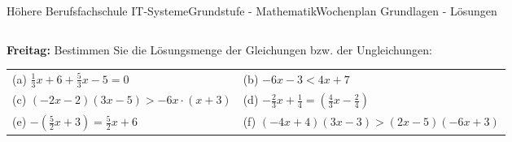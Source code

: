 \documentclass[oneside,openany,headings=optiontotoc,11pt,numbers=noenddot]{scrreprt}
\begin{document}
\begin{worksheet}{Höhere Berufsfachschule IT-Systeme}{Grundstufe - Mathematik}{Wochenplan Grundlagen - Lösungen}
\begin{framed}
\begin{tabularx}{\textwidth}{XXX}
			\end{tabularx}
		\end{framed}
		\begin{framed}
			\noindent
			\textbf{Freitag:} Bestimmen Sie die Lösungsmenge der Gleichungen bzw. der Ungleichungen:\\
			\begin{tabularx}{\textwidth}{XX}
				(a) \(\frac{1}{3}x + 6 + \frac{5}{3}x -5 = 0\) & (b) \(-6x-3 < 4x+7\)\\
				(c) \((-2x-2)(3x-5) > -6x\cdot(x+3)\) &	(d) \(-\frac{2}{3}x + \frac{1}{4} = (\frac{4}{3}x - \frac{2}{4})\)\\
				(e) \(-(\frac{5}{2}x+3) = \frac{5}{2}x +6\) & (f) \((-4x+4)(3x - 3) > (2x-5)(-6x +3)\)
			\end{tabularx}
		\end{framed}
	\end{worksheet}
\end{document}
